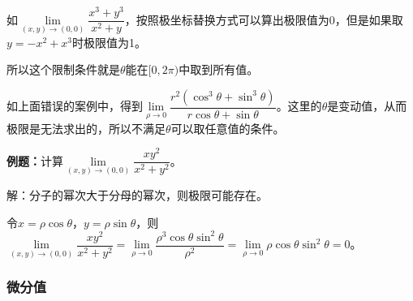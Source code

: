 如$\lim\limits_{(x,y)\to(0,0)}\dfrac{x^3+y^3}{x^2+y}$，按照极坐标替换方式可以算出极限值为0，但是如果取$y=-x^2+x^3$时极限值为1。

所以这个限制条件就是$\theta$能在$[0,2\pi)$中取到所有值。

如上面错误的案例中，得到$\lim\limits_{\rho\to0}\dfrac{r^2(\cos^3\theta+\sin^3\theta)}{r\cos\theta+\sin\theta}$。这里的$\theta$是变动值，从而极限是无法求出的，所以不满足$\theta$可以取任意值的条件。





\textbf{例题：}计算$\lim\limits_{(x,y)\to(0,0)}\dfrac{xy^2}{x^2+y^2}$。

解：分子的幂次大于分母的幂次，则极限可能存在。

令$x=\rho\cos\theta$，$y=\rho\sin\theta$，则$\lim\limits_{(x,y)\to(0,0)}\dfrac{xy^2}{x^2+y^2}=\lim\limits_{\rho\to0}\dfrac{\rho^3\cos\theta\sin^2\theta}{\rho^2}=\lim\limits_{\rho\to0}\rho\cos\theta\sin^2\theta=0$。




\subsubsection{微分值}

\paragraph{}\leavevmode \medskip

\paragraph{}\leavevmode \medskip

